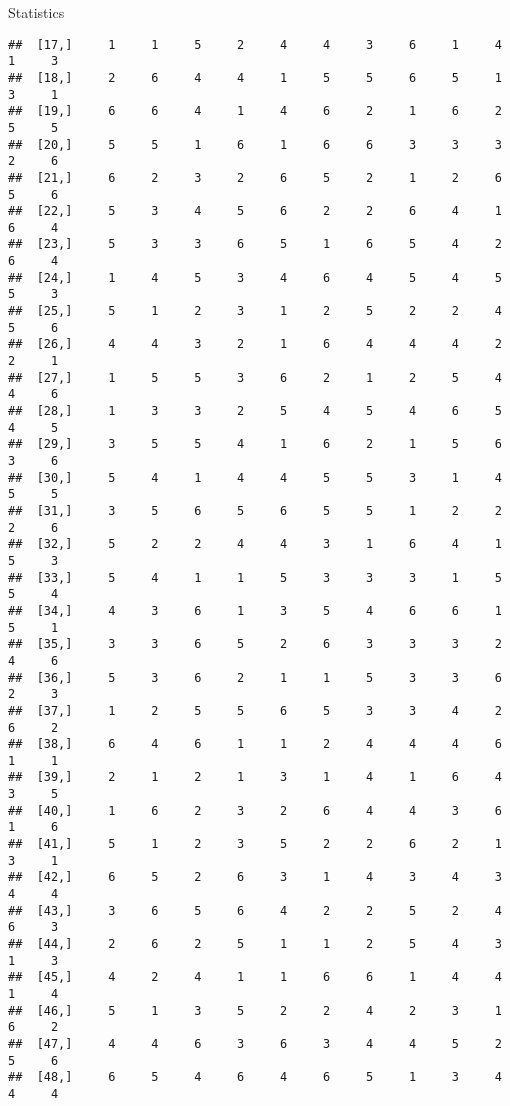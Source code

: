 \documentclass[
  ignorenonframetext,
]{beamer}
\begin{document}
\begin{frame}[fragile]{Statistics}
\begin{verbatim}
##  [17,]     1     1     5     2     4     4     3     6     1     4     1     3
##  [18,]     2     6     4     4     1     5     5     6     5     1     3     1
##  [19,]     6     6     4     1     4     6     2     1     6     2     5     5
##  [20,]     5     5     1     6     1     6     6     3     3     3     2     6
##  [21,]     6     2     3     2     6     5     2     1     2     6     5     6
##  [22,]     5     3     4     5     6     2     2     6     4     1     6     4
##  [23,]     5     3     3     6     5     1     6     5     4     2     6     4
##  [24,]     1     4     5     3     4     6     4     5     4     5     5     3
##  [25,]     5     1     2     3     1     2     5     2     2     4     5     6
##  [26,]     4     4     3     2     1     6     4     4     4     2     2     1
##  [27,]     1     5     5     3     6     2     1     2     5     4     4     6
##  [28,]     1     3     3     2     5     4     5     4     6     5     4     5
##  [29,]     3     5     5     4     1     6     2     1     5     6     3     6
##  [30,]     5     4     1     4     4     5     5     3     1     4     5     5
##  [31,]     3     5     6     5     6     5     5     1     2     2     2     6
##  [32,]     5     2     2     4     4     3     1     6     4     1     5     3
##  [33,]     5     4     1     1     5     3     3     3     1     5     5     4
##  [34,]     4     3     6     1     3     5     4     6     6     1     5     1
##  [35,]     3     3     6     5     2     6     3     3     3     2     4     6
##  [36,]     5     3     6     2     1     1     5     3     3     6     2     3
##  [37,]     1     2     5     5     6     5     3     3     4     2     6     2
##  [38,]     6     4     6     1     1     2     4     4     4     6     1     1
##  [39,]     2     1     2     1     3     1     4     1     6     4     3     5
##  [40,]     1     6     2     3     2     6     4     4     3     6     1     6
##  [41,]     5     1     2     3     5     2     2     6     2     1     3     1
##  [42,]     6     5     2     6     3     1     4     3     4     3     4     4
##  [43,]     3     6     5     6     4     2     2     5     2     4     6     3
##  [44,]     2     6     2     5     1     1     2     5     4     3     1     3
##  [45,]     4     2     4     1     1     6     6     1     4     4     1     4
##  [46,]     5     1     3     5     2     2     4     2     3     1     6     2
##  [47,]     4     4     6     3     6     3     4     4     5     2     5     6
##  [48,]     6     5     4     6     4     6     5     1     3     4     4     4

\end{verbatim}
\end{frame}
\end{document}
